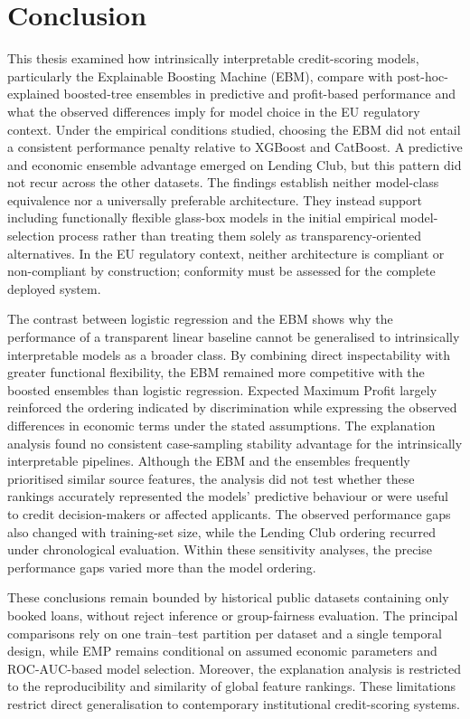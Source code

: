 \chapter{Conclusion}\label{ch:conclusion}

This thesis examined how intrinsically interpretable credit-scoring models, particularly the Explainable Boosting Machine (EBM), compare with post-hoc-explained boosted-tree ensembles in predictive and profit-based performance and what the observed differences imply for model choice in the EU regulatory context. Under the empirical conditions studied, choosing the EBM did not entail a consistent performance penalty relative to XGBoost and CatBoost. A predictive and economic ensemble advantage emerged on Lending Club, but this pattern did not recur across the other datasets. The findings establish neither model-class equivalence nor a universally preferable architecture. They instead support including functionally flexible glass-box models in the initial empirical model-selection process rather than treating them solely as transparency-oriented alternatives. In the EU regulatory context, neither architecture is compliant or non-compliant by construction; conformity must be assessed for the complete deployed system.

The contrast between logistic regression and the EBM shows why the performance of a transparent linear baseline cannot be generalised to intrinsically interpretable models as a broader class. By combining direct inspectability with greater functional flexibility, the EBM remained more competitive with the boosted ensembles than logistic regression. Expected Maximum Profit largely reinforced the ordering indicated by discrimination while expressing the observed differences in economic terms under the stated assumptions. The explanation analysis found no consistent case-sampling stability advantage for the intrinsically interpretable pipelines. Although the EBM and the ensembles frequently prioritised similar source features, the analysis did not test whether these rankings accurately represented the models' predictive behaviour or were useful to credit decision-makers or affected applicants. The observed performance gaps also changed with training-set size, while the Lending Club ordering recurred under chronological evaluation. Within these sensitivity analyses, the precise performance gaps varied more than the model ordering.

These conclusions remain bounded by historical public datasets containing only booked loans, without reject inference or group-fairness evaluation. The principal comparisons rely on one train--test partition per dataset and a single temporal design, while EMP remains conditional on assumed economic parameters and ROC-AUC-based model selection. Moreover, the explanation analysis is restricted to the reproducibility and similarity of global feature rankings. These limitations restrict direct generalisation to contemporary institutional credit-scoring systems.

